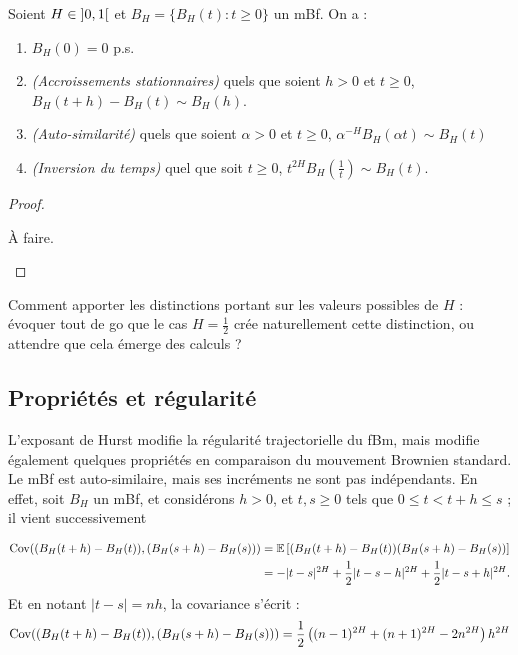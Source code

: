 \begin{proposition}
  \label{pro:fbm-basic-properties}
  Soient $H\in\left]0,1\right[$ et $B_H = \{B_H(t) : t\geq 0\}$ un mBf. On
  a :
  \begin{enumerate}
  \item $B_H(0) = 0$ p.s.
  \item \emph{(Accroissements stationnaires)} quels que soient $h>0$
    et $t\geq 0$, $B_H(t+h)-B_H(t)\sim B_H(h)$.
  \item \emph{(Auto-similarité)} quels que soient $\alpha>0$ et
    $t\geq 0$, $\alpha^{-H} B_H(\alpha t) \sim B_H(t)$
  \item \emph{(Inversion du temps)} quel que soit $t\geq 0$,
    $t^{2H}B_H(\frac{1}{t}) \sim B_H(t)$.
  \end{enumerate}
\end{proposition}
\begin{proof}
  \begin{alert}
    À faire.
  \end{alert}
\end{proof}

\begin{question}
  Comment apporter les distinctions portant sur les valeurs possibles
  de $H$ : évoquer tout de go que le cas $H=\frac{1}{2}$ crée
  naturellement cette distinction, ou attendre que cela émerge des
  calculs ?
\end{question}

\subsection{Propriétés et régularité}
L'exposant de Hurst modifie la régularité trajectorielle du fBm, mais
modifie également quelques propriétés en comparaison du mouvement
Brownien standard. Le mBf est auto-similaire, mais ses incréments ne
sont pas indépendants. En effet, soit $B_H$ un mBf, et considérons
$h>0$, et $t,s\geq 0$ tels que $0\leq t<t+h\leq s$ ; il vient
successivement

\begin{align*}
  \operatorname{Cov}((B_H(t+h)-B_H(t)),(B_H(s+h)-B_H(s))) &= \mathbb{E}\left[(B_H(t+h)-B_H(t))(B_H(s+h)-B_H(s))\right] \\
                                            &= -|t-s|^{2H}+\frac{1}{2}|t-s-h|^{2H}+\frac{1}{2}|t-s+h|^{2H}.
\end{align*}
Et en notant $|t-s|=nh$, la covariance s'écrit :
\begin{equation*}
  \operatorname{Cov}((B_H(t+h)-B_H(t)),(B_H(s+h)-B_H(s))) = \frac{1}{2}\left((n-1)^{2H} + (n+1)^{2H} - 2n^{2H}\right)h^{2H}
\end{equation*}

